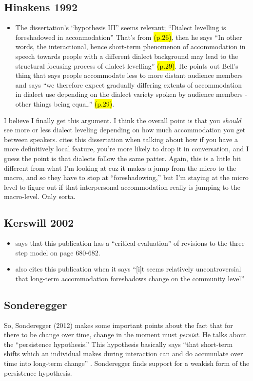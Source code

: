 \subsection{Hinskens 1992}
\begin{itemize}
    \item The dissertation's ``hypothesis III'' seems relevant; ``Dialect levelling is foreshadowed in acconmodation'' That's from \hl{(p.26)}, then he says ``In other words, the interactional, hence short-term phenomenon of accommodation in speech towards people with a different dialect background may lead to the structural focusing process of dialect levelling'' \hl{(p.29)}. He points out Bell's thing that says people accommodate less to more distant audience members and says ``we therefore expect gradually differing extents of accommodation in dialect use depending on the dialect variety spoken by audience members - other things being equal.'' \hl{(p.29)}.
\end{itemize}
    I believe I finally get this argument. I think the overall point is that you \emph{should} see more or less dialect leveling depending on how much accommodation you get between speakers. \cite{auer2005role} cites this dissertation when talking about how if you have a more definitively local feature, you're more likely to drop it in conversation, and I guess the point is that dialects follow the same patter. Again, this is a little bit different from what I'm looking at cuz it makes a jump from the micro to the macro, and so they have to stop at ``foreshadowing,'' but I'm staying at the micro level to figure out if that interpersonal accommodation really is jumping to the macro-level. Only sorta.
    
\subsection{Kerswill 2002}
\begin{itemize}
    \item \cite[p.337]{auer2005role} says that this publication has a ``critical evaluation'' of revisions to the three-step model on page 680-682.
    \item \cite[p.351]{auer2005role} also cites this publication when it says ``[i]t seems relatively uncontroversial that long-term accommodation foreshadows change on the community level''
\end{itemize}
\subsection{Sonderegger}
So, Sonderegger (2012) makes some important points about the fact that for there to be change over time, change in the moment must \textit{persist}. He talks about the ``persistence hypothesis.'' This hypothesis basically says ``that short-term shifts which an individual makes during interaction can and do accumulate over time into long-term change'' \citep[p.102]{sonderegger2012phonetic}. Sonderegger finds support for a weakish form of the persistence hypothesis.

